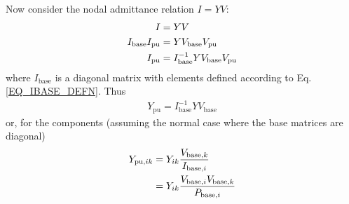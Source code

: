 \documentclass[11pt]{article}
\begin{document}
Now consider the nodal admittance relation $I = YV$:
\begin{align}
	I &= YV \notag \\
	I_\text{base}I_\text{pu} &= YV_\text{base}V_\text{pu} \notag \\
	I_\text{pu} &= I_\text{base}^{-1}YV_\text{base}V_\text{pu}
\end{align}
where $I_\text{base}$ is a diagonal matrix with elements defined according to Eq. \ref{EQ_IBASE_DEFN}. Thus
\begin{align}
	Y_\text{pu} = I_\text{base}^{-1}YV_\text{base}
\end{align}
or, for the components (assuming the normal case where the base matrices are diagonal)
\begin{align}
	Y_{\text{pu},ik} &= Y_{ik}\frac{V_{\text{base},k}}{I_{\text{base},i}} \notag \\
	&= Y_{ik}\frac{V_{\text{base},i}V_{\text{base},k}}{P_{\text{base},i}}
\end{align}
\end{document}
